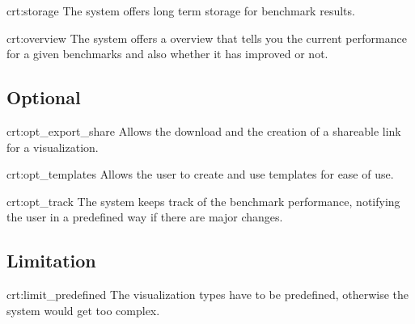 {crt:storage}
{The system offers long term storage for benchmark results.}

{crt:overview}
{The system offers a overview that tells you the current performance for a given benchmarks and also whether it has improved or not.}


\subsection{Optional}

{crt:opt_export_share}
{Allows the download and the creation of a shareable link for a visualization.}

{crt:opt_templates}
{Allows the \gls{user} to create and use \glspl{template} for ease of use.}

{crt:opt_track}
{The system keeps track of the benchmark performance, notifying the \gls{user} in a predefined way if there are major changes.}


\subsection{Limitation}

{crt:limit_predefined}
{The \gls{visualization} types have to be predefined, otherwise the system would get too complex.}
